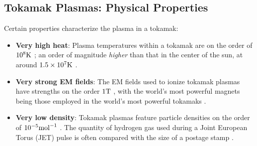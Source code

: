 \subsection*{Tokamak Plasmas: Physical Properties}
    Certain properties characterize the plasma in a tokamak:
    \begin{itemize}
        \item  {\bf Very high heat}: Plasma temperatures within a tokamak are on the order of $10^{8}\mathrm{K}$ \BA{[Ref]}; an order of magnitude \emph{higher} than that in the center of the sun, at around $1.5\times10^{7}\mathrm{K}$ \BA{[Ref]}.
        \item  {\bf Very strong EM fields}: The EM fields used to ionize tokamak plasmas have strengths on the order $1\mathrm{T}$ \BA{[Ref]}, with the world's most powerful magnets being those employed in the world's most powerful tokamaks \BA{[Ref]}.
        \item  {\bf Very low density}:  Tokamak plasmas feature particle densities on the order of $10^{- 5}{\rm mol}^{- 1}$   \BA{[Ref]}. The quantity of hydrogen gas used during a Joint European Torus (JET) pulse is often compared with the size  of a postage stamp \BA{[Ref]}.
    \end{itemize}



    
